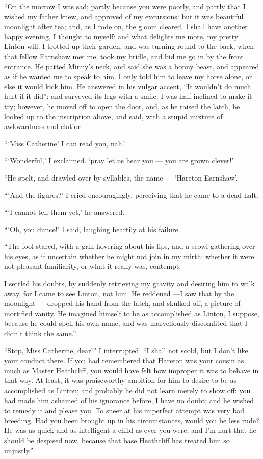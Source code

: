 \par “On the morrow I was sad; partly because you were poorly, and partly that I wished my father knew, and approved of my excursions: but it was beautiful moonlight after tea; and, as I rode on, the gloom cleared. I shall have another happy evening, I thought to myself: and what delights me more, my pretty Linton will. I trotted up their garden, and was turning round to the back, when that fellow Earnshaw met me, took my bridle, and bid me go in by the front entrance. He patted Minny's neck, and said she was a bonny beast, and appeared as if he wanted me to speak to him. I only told him to leave my horse alone, or else it would kick him. He answered in his vulgar accent, “It wouldn't do much hurt if it did”; and surveyed its legs with a smile. I was half inclined to make it try; however, he moved off to open the door, and, as he raised the latch, he looked up to the inscription above, and said, with a stupid mixture of awkwardness and elation —
\par “‘Miss Catherine! I can read yon, nah.’
\par “‘Wonderful,’ I exclaimed. ‘pray let us hear you — you are grown clever!’
\par “He spelt, and drawled over by syllables, the name — ‘Hareton Earnshaw'.
\par “‘And the figures?’ I cried encouragingly, perceiving that he came to a dead halt.
\par “‘I cannot tell them yet,’ he answered.
\par “‘Oh, you dunce!’ I said, laughing heartily at his failure.
\par “The fool stared, with a grin hovering about his lips, and a scowl gathering over his eyes, as if uncertain whether he might not join in my mirth: whether it were not pleasant familiarity, or what it really was, contempt.
\par I settled his doubts, by suddenly retrieving my gravity and desiring him to walk away, for I came to see Linton, not him. He reddened —I saw that by the moonlight — dropped his hand from the latch, and skulked off, a picture of mortified vanity. He imagined himself to be as accomplished as Linton, I suppose, because he could spell his own name; and was marvellously discomfited that I didn't think the same.”
\par “Stop, Miss Catherine, dear!” I interrupted. “I shall not scold, but I don't like your conduct there. If you had remembered that Hareton was your cousin as much as Master Heathcliff, you would have felt how improper it was to behave in that way. At least, it was praiseworthy ambition for him to desire to be as accomplished as Linton; and probably he did not learn merely to show off: you had made him ashamed of his ignorance before, I have no doubt; and he wished to remedy it and please you. To sneer at his imperfect attempt was very bad breeding. Had you been brought up in his circumstances, would you be less rude? He was as quick and as intelligent a child as ever you were; and I'm hurt that he should be despised now, because that base Heathcliff has treated him so unjustly.”
